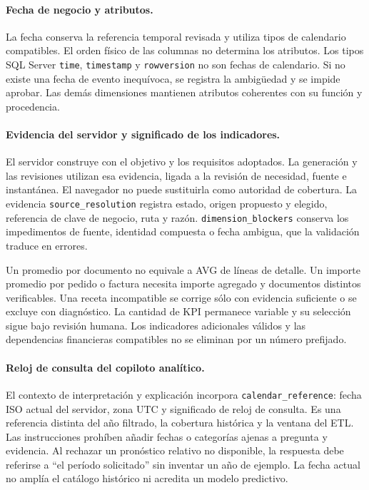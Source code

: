 \documentclass[11pt,letterpaper]{article}
\newcommand{\file}[1]{\texttt{#1}}
\begin{document}
\paragraph{Fecha de negocio y atributos.}
La fecha conserva la referencia temporal revisada y utiliza tipos de calendario
compatibles. El orden físico de las columnas no determina los atributos. Los
tipos SQL Server \file{time}, \file{timestamp} y \file{rowversion} no son fechas de
calendario. Si no existe una fecha de evento inequívoca, se registra la
ambigüedad y se impide aprobar. Las demás dimensiones mantienen atributos
coherentes con su función y procedencia.

\paragraph{Evidencia del servidor y significado de los indicadores.}
El servidor construye  con el objetivo
y los requisitos adoptados. La generación y las revisiones utilizan esa
evidencia, ligada a la revisión de necesidad, fuente e instantánea. El navegador
no puede sustituirla como autoridad de cobertura. La evidencia
\file{source\_resolution} registra estado, origen propuesto y elegido, referencia
de clave de negocio, ruta y razón. \file{dimension\_blockers} conserva los
impedimentos de fuente, identidad compuesta o fecha ambigua, que la validación
traduce en errores.

Un promedio por documento no equivale a AVG de líneas de detalle. Un importe
promedio por pedido o factura necesita importe agregado y documentos distintos
verificables. Una receta incompatible se corrige sólo con evidencia suficiente
o se excluye con diagnóstico. La cantidad de KPI permanece variable y su
selección sigue bajo revisión humana. Los indicadores adicionales válidos y las
dependencias financieras compatibles no se eliminan por un número prefijado.

\paragraph{Reloj de consulta del copiloto analítico.}
El contexto de interpretación y explicación incorpora \file{calendar\_reference}:
fecha ISO actual del servidor, zona UTC y significado de reloj de consulta. Es una
referencia distinta del año filtrado, la cobertura histórica y la ventana del ETL.
Las instrucciones prohíben añadir fechas o categorías ajenas a pregunta y evidencia.
Al rechazar un pronóstico relativo no disponible, la respuesta debe referirse a
``el período solicitado'' sin inventar un año de ejemplo. La fecha actual no amplía
el catálogo histórico ni acredita un modelo predictivo.
\end{document}
